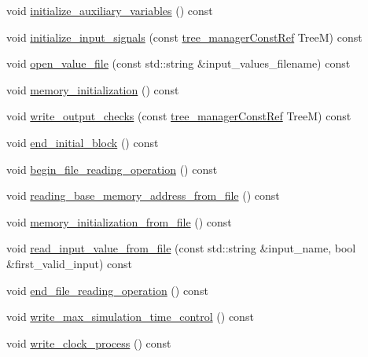 \begin{DoxyCompactItemize}
\item 
void \hyperlink{classTestbenchGenerationBaseStep_a1055ee6f17948449e8ab78c798f4440c}{initialize\+\_\+auxiliary\+\_\+variables} () const
\item 
void \hyperlink{classTestbenchGenerationBaseStep_ab4bb94d28070dd729e236fbb1810c356}{initialize\+\_\+input\+\_\+signals} (const \hyperlink{tree__manager_8hpp_a792e3f1f892d7d997a8d8a4a12e39346}{tree\+\_\+manager\+Const\+Ref} TreeM) const
\item 
void \hyperlink{classTestbenchGenerationBaseStep_a158e54657d84eef9c436e3f8e724ba19}{open\+\_\+value\+\_\+file} (const std\+::string \&input\+\_\+values\+\_\+filename) const
\item 
void \hyperlink{classTestbenchGenerationBaseStep_abf62b47a373a3fcd67d892b8f92e0bd9}{memory\+\_\+initialization} () const
\item 
void \hyperlink{classTestbenchGenerationBaseStep_a4739acf051dcddc240eee6d1a4719308}{write\+\_\+output\+\_\+checks} (const \hyperlink{tree__manager_8hpp_a792e3f1f892d7d997a8d8a4a12e39346}{tree\+\_\+manager\+Const\+Ref} TreeM) const
\item 
void \hyperlink{classTestbenchGenerationBaseStep_a3e753eed3a77b2340fb97e257f2ba820}{end\+\_\+initial\+\_\+block} () const
\item 
void \hyperlink{classTestbenchGenerationBaseStep_ab0b8f178bb3899f2d4a0ba1537673fbc}{begin\+\_\+file\+\_\+reading\+\_\+operation} () const
\item 
void \hyperlink{classTestbenchGenerationBaseStep_a91b50173691b97e21e807b6b65aed466}{reading\+\_\+base\+\_\+memory\+\_\+address\+\_\+from\+\_\+file} () const
\item 
void \hyperlink{classTestbenchGenerationBaseStep_aee6bfb330acf36f11d05c4bedffa4885}{memory\+\_\+initialization\+\_\+from\+\_\+file} () const
\item 
void \hyperlink{classTestbenchGenerationBaseStep_a5ce35855c2c92e267d07b648b69dbbe3}{read\+\_\+input\+\_\+value\+\_\+from\+\_\+file} (const std\+::string \&input\+\_\+name, bool \&first\+\_\+valid\+\_\+input) const
\item 
void \hyperlink{classTestbenchGenerationBaseStep_ae3c011333a26f77252e27244cd7f08a9}{end\+\_\+file\+\_\+reading\+\_\+operation} () const
\item 
void \hyperlink{classTestbenchGenerationBaseStep_aaca8d78023026f97ce9f8bbb3bfc5699}{write\+\_\+max\+\_\+simulation\+\_\+time\+\_\+control} () const
\item 
void \hyperlink{classTestbenchGenerationBaseStep_a96a147c621c5aa82d4a87ef81b4b5c06}{write\+\_\+clock\+\_\+process} () const

\end{DoxyCompactItemize}
